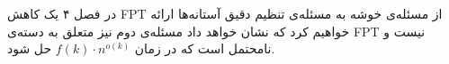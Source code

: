 
در فصل ۴ یک کاهش FPT از مسئله‌ی خوشه به مسئله‌ی تنظیم دقیق آستانه‌ها ارائه خواهیم کرد که نشان خواهد داد مسئله‌ی دوم نیز متعلق به دسته‌ی FPT نیست و نامحتمل است که در زمان
$f(k) \cdot n^{o(k)}$
حل شود.

